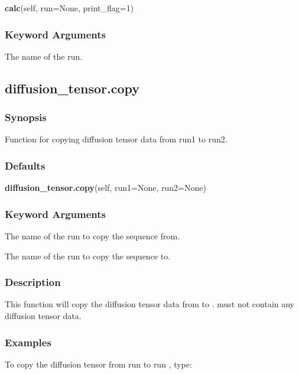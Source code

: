 \textsf{\textbf{calc}(self, run=None, print\_flag=1)}


\subsubsection{Keyword Arguments}


  The name of the run.


\newpage

\subsection{diffusion\_tensor.copy}


\subsubsection{Synopsis}

Function for copying diffusion tensor data from run1 to run2.

\subsubsection{Defaults}

\textsf{\textbf{diffusion\_tensor.copy}(self, run1=None, run2=None)}


\subsubsection{Keyword Arguments}


  The name of the run to copy the sequence from.

  The name of the run to copy the sequence to.

\subsubsection{Description}

This function will copy the diffusion tensor data from 
 to 
.  
 must not
contain any diffusion tensor data.


\subsubsection{Examples}

To copy the diffusion tensor from run 
 to run 
, type:


